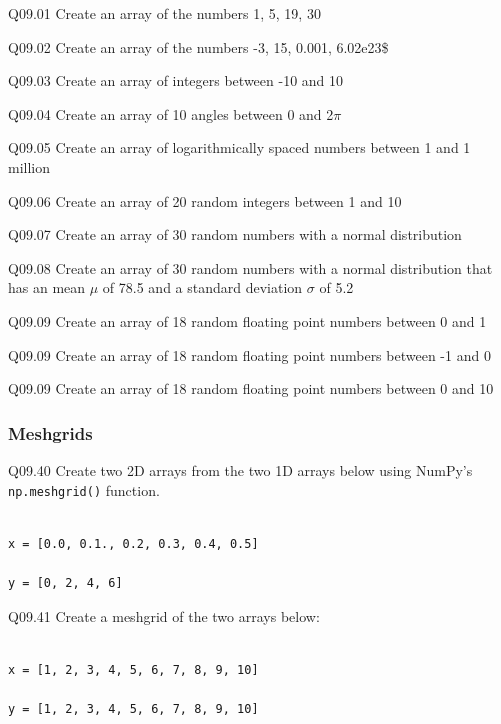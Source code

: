 \documentclass{book}
\newenvironment{problems}{}{}  %
\begin{document}
    
        \begin{problems}
        Q09.01 Create an array of the numbers 1, 5, 19, 30

Q09.02 Create an array of the numbers -3, 15, 0.001, 6.02e23\$

Q09.03 Create an array of integers between -10 and 10

Q09.04 Create an array of 10 angles between 0 and 2\(\pi\)

Q09.05 Create an array of logarithmically spaced numbers between 1 and 1
million

Q09.06 Create an array of 20 random integers between 1 and 10

Q09.07 Create an array of 30 random numbers with a normal distribution

Q09.08 Create an array of 30 random numbers with a normal distribution
that has an mean \(\mu\) of 78.5 and a standard deviation \(\sigma\) of
5.2

Q09.09 Create an array of 18 random floating point numbers between 0 and
1

Q09.09 Create an array of 18 random floating point numbers between -1
and 0

Q09.09 Create an array of 18 random floating point numbers between 0 and
10
        \end{problems}

    




    
        \subsubsection{Meshgrids}\label{meshgrids}
    




    
        Q09.40 Create two 2D arrays from the two 1D arrays below using NumPy's
\lstinline!np.meshgrid()! function.

\begin{lstlisting}

x = [0.0, 0.1., 0.2, 0.3, 0.4, 0.5]

y = [0, 2, 4, 6]
\end{lstlisting}

Q09.41 Create a meshgrid of the two arrays below:

\begin{lstlisting}

x = [1, 2, 3, 4, 5, 6, 7, 8, 9, 10]

y = [1, 2, 3, 4, 5, 6, 7, 8, 9, 10]
\end{lstlisting}
\end{document}
